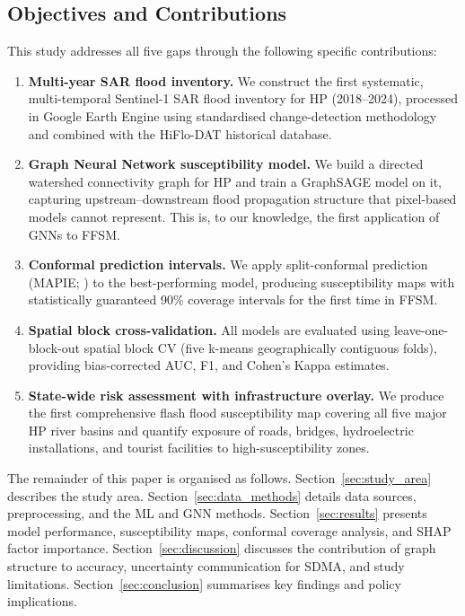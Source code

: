 \subsection{Objectives and Contributions}
\label{sec:objectives}

This study addresses all five gaps through the following specific contributions:

\begin{enumerate}
  \item \textbf{Multi-year SAR flood inventory.}
    We construct the first systematic, multi-temporal Sentinel-1 SAR flood inventory
    for HP (2018--2024), processed in Google Earth Engine using standardised
    change-detection methodology and combined with the HiFlo-DAT historical database.

  \item \textbf{Graph Neural Network susceptibility model.}
    We build a directed watershed connectivity graph for HP and train a
    GraphSAGE \citep{hamilton2017graphsage} model on it,
    capturing upstream--downstream flood propagation structure that
    pixel-based models cannot represent.
    This is, to our knowledge, the first application of GNNs to FFSM.

  \item \textbf{Conformal prediction intervals.}
    We apply split-conformal prediction (MAPIE; \citealt{taquet2022mapie})
    to the best-performing model, producing susceptibility maps with
    statistically guaranteed 90\% coverage intervals for the first time in FFSM.

  \item \textbf{Spatial block cross-validation.}
    All models are evaluated using leave-one-block-out spatial block CV
    (five k-means geographically contiguous folds),
    providing bias-corrected AUC, F1, and Cohen's Kappa estimates.

  \item \textbf{State-wide risk assessment with infrastructure overlay.}
    We produce the first comprehensive flash flood susceptibility map
    covering all five major HP river basins
    and quantify exposure of roads, bridges, hydroelectric installations,
    and tourist facilities to high-susceptibility zones.
\end{enumerate}

The remainder of this paper is organised as follows.
Section~\ref{sec:study_area} describes the study area.
Section~\ref{sec:data_methods} details data sources, preprocessing,
and the ML and GNN methods.
Section~\ref{sec:results} presents model performance, susceptibility maps,
conformal coverage analysis, and SHAP factor importance.
Section~\ref{sec:discussion} discusses the contribution of graph structure to accuracy,
uncertainty communication for SDMA, and study limitations.
Section~\ref{sec:conclusion} summarises key findings and policy implications.
